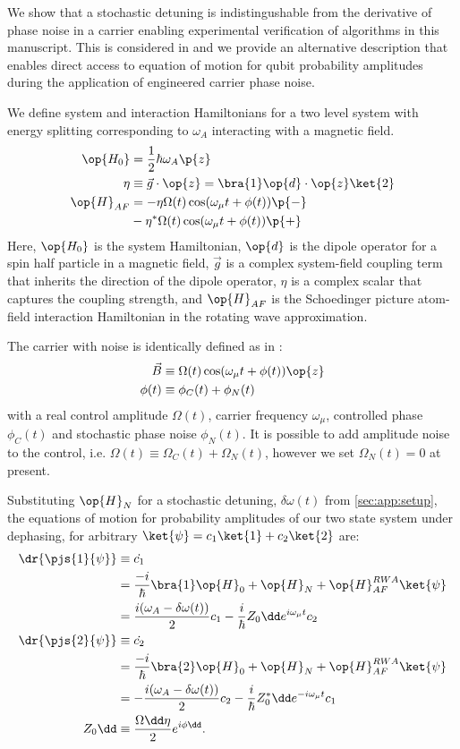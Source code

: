 We show that a stochastic detuning is indistingushable from the derivative of phase noise in a carrier enabling experimental verification of algorithms in this manuscript.
This is considered in \cite{soare2014} and we provide an alternative description that enables direct access to equation of motion for qubit probability amplitudes during the application of engineered carrier phase noise. 

We define system and interaction Hamiltonians for a two level system with energy splitting corresponding to $\omega_A$  interacting with a magnetic field. 
\\
\begin{align}
\op{H_0} &= \frac{1}{2} \hbar \omega_A \p{z} \\
\eta & \equiv \vec{g} \cdot \op{z} = \bra{1} \op{d} \cdot \op{z} \ket{2} \\
\op{H}_{AF} & = -\eta \Omega(t)  \cos(\omega_\mu t + \phi(t)) \p{-} \\
& - \eta^* \Omega(t)  \cos(\omega_\mu t + \phi(t)) \p{+}
\end{align} Here, $\op{H_0}$ is the system Hamiltonian, $\op{d}$ is the dipole operator for a spin half particle in a magnetic field, $\vec{g}$ is a complex system-field coupling term that inherits the direction of the dipole operator, $\eta$ is a complex scalar that captures the coupling strength, and $\op{H}_{AF}$ is the Schoedinger picture atom-field interaction Hamiltonian in the rotating wave approximation.

The carrier with noise is identically defined as in \cite{soare2014}:
\begin{align}
\vec{B} &\equiv \Omega(t) \cos(\omega_\mu t + \phi(t)) \op{z} \\
\phi(t) & \equiv \phi_C(t) + \phi_N(t)
\end{align}
with a real control amplitude $\Omega(t)$, carrier frequency $\omega_\mu$, controlled phase $\phi_C(t)$ and stochastic phase noise $\phi_N(t)$.  It is possible to add amplitude noise to the control, i.e. $\Omega(t) \equiv \Omega_C(t) + \Omega_N(t)$, however we set $\Omega_N(t) =0$ at present. 

Substituting $\op{H}_{N}$ for a stochastic detuning, $\delta \omega (t)$ from \cref{sec:app:setup}, the equations of motion for probability amplitudes of our two state system under dephasing, for arbitrary $\ket{\psi} = c_1 \ket{1} + c_2\ket{2} $ are:
\begin{align}
\dr{\pjs{1}{\psi}} &\equiv \dot{c_1} \\
& = \frac{-i}{\hbar}\bra{1} \op{H}_0 + \op{H}_{N} + \op{H}_{AF}^{RWA}  \ket{\psi} \\
& = \frac{i(\omega_A - \delta\omega(t)) }{2}c_1 - \frac{i}{\hbar}Z_0\dd e^{i\omega_\mu t}c_2\\
\dr{\pjs{2}{\psi}} &\equiv \dot{c_2} \\
& = \frac{-i}{\hbar}\bra{2} \op{H}_0 + \op{H}_{N} + \op{H}_{AF}^{RWA}  \ket{\psi} \\
& = -\frac{i(\omega_A - \delta\omega(t)) }{2}c_2 - \frac{i}{\hbar}Z_0^*\dd e^{-i\omega_\mu t}c_1 \\
\quad Z_0\dd &\equiv \frac{\Omega\dd\eta}{2}e^{i\phi\dd}.
\end{align}

